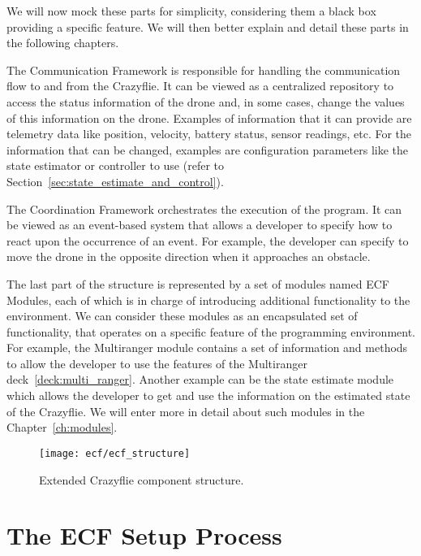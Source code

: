 We will now mock these parts for simplicity, considering them a black box providing a specific feature.
We will then better explain and detail these parts in the following chapters.

The Communication Framework is responsible for handling the communication flow to and from the Crazyflie.
It can be viewed as a centralized repository to access the status information of the drone and, in some cases, change the values of this information on the drone.
Examples of information that it can provide are telemetry data like position, velocity, battery status, sensor readings, etc. 
For the information that can be changed, examples are configuration parameters like the state estimator or controller to use (refer to Section~\ref{sec:state_estimate_and_control}).

The Coordination Framework orchestrates the execution of the program. 
It can be viewed as an event-based system that allows a developer to specify how to react upon the occurrence of an event.
For example, the developer can specify to move the drone in the opposite direction when it approaches an obstacle.

The last part of the structure is represented by a set of modules named ECF Modules, each of which is in charge of introducing additional functionality to the environment.
We can consider these modules as an encapsulated set of functionality, that operates on a specific feature of the programming environment.
For example, the Multiranger module contains a set of information and methods to allow the developer to use the features of the Multiranger deck~\ref{deck:multi_ranger}.
Another example can be the state estimate module which allows the developer to get and use the information on the estimated state of the Crazyflie.
We will enter more in detail about such modules in the Chapter~\ref{ch:modules}.
 
\begin{SCfigure}[\sidecaptionrelwidth][tb]
    \texttt{[image: ecf/ecf\_structure]}
    \caption{Extended Crazyflie component structure.}\label{fig:ecf_structure}
\end{SCfigure}

\pagebreak%

\section{The ECF Setup Process}\label{sec:ecf_setup_process}


